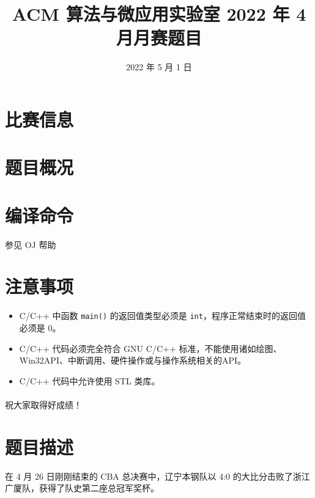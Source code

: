 \documentclass{../cpct/ctpro}
\title{ACM 算法与微应用实验室 2022 年 4 月月赛题目}
\date{2022 年 5 月 1 日}
\begin{document}
\maketitle
{}

\section*{比赛信息}


\section*{题目概况}

\problemtab

\section*{编译命令}

参见 OJ 帮助

\section*{注意事项}

\begin{itemize}
    \item C/C++ 中函数 \verb|main()| 的返回值类型必须是 \verb|int|，程序正常结束时的返回值必须是 $0$。
    \item C/C++ 代码必须完全符合 GNU C/C++ 标准，不能使用诸如绘图、Win32API、中断调用、硬件操作或与操作系统相关的API。
    \item C/C++ 代码中允许使用 STL 类库。
\end{itemize}

\paragraph*{} 祝大家取得好成绩！

\makeproblem
\section*{题目描述}

在 4 月 26 日刚刚结束的 CBA 总决赛中，辽宁本钢队以 4:0 的大比分击败了浙江广厦队，获得了队史第二座总冠军奖杯。
\end{document}
